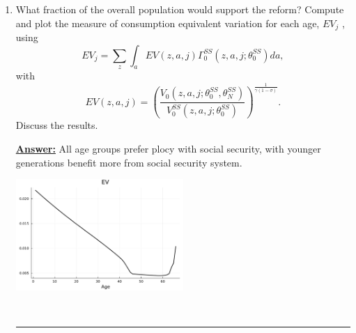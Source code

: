 \documentclass{article} %
\theoremstyle{definition}
\newenvironment{solution}[1][Answer]{\begin{singlespace}\underline{\textbf{#1:}}\quad }{\ \rule{0.3em}{0.3em}\end{singlespace}} %
\begin{document}
\begin{enumerate}
\clearpage  
\item  What fraction of the overall population would support the reform? Compute and plot the measure of consumption equivalent variation for each age, $ EV_j $ , using $$ EV_j = \sum_z \int_a EV(z,a,j)  \Gamma_0^{SS}(z,a,j; \theta_0^{SS})  da, $$ with \[  EV(z,a,j) = \left(  \frac{ V_0(z,a,j; \theta_0^{SS}, \theta_N^{SS}) }{  V_0^{SS}(z,a,j; \theta_0^{SS}) } \right)^{\frac{1}{\gamma(1 - \sigma)}} . \] Discuss the results.		
  \begin{solution}
    All age groups prefer plocy with social security, with younger generations benefit more from social security system.
    \begin{center}
      \includegraphics[width=0.5\textwidth]{Figures/EV.pdf}
      
    \end{center}
    
  \end{solution}
\end{enumerate}
\end{document}
